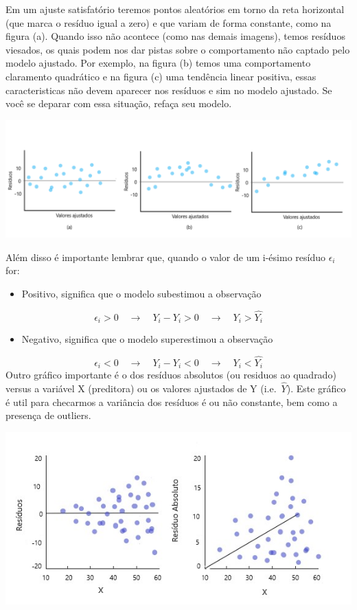 \documentclass[
]{article}
\providecommand{\tightlist}{%
  \setlength{\itemsep}{0pt}\setlength{\parskip}{0pt}}
\begin{document}
Em um ajuste satisfatório teremos pontos aleatórios em torno da reta
horizontal (que marca o resíduo igual a zero) e que variam de forma
constante, como na figura (a). Quando isso não acontece (como nas demais
imagens), temos resíduos viesados, os quais podem nos dar pistas sobre o
comportamento não captado pelo modelo ajustado. Por exemplo, na figura
(b) temos uma comportamento claramento quadrático e na figura (c) uma
tendência linear positiva, essas caracteristicas não devem aparecer nos
resíduos e sim no modelo ajustado. Se você se deparar com essa situação,
refaça seu modelo.

\includegraphics{images/residuos2.png}

Além disso é importante lembrar que, quando o valor de um i-ésimo
resíduo \(\epsilon_i\) for:

\begin{itemize}
\tightlist
\item
  Positivo, significa que o modelo subestimou a observação
\end{itemize}

\[\epsilon_i>0 \quad \to \quad Y_i-\hat{Y_i}>0 \quad \to \quad Y_i>\hat{Y_i}\]

\begin{itemize}
\tightlist
\item
  Negativo, significa que o modelo superestimou a observação
\end{itemize}

\[\epsilon_i<0 \quad \to \quad Y_i-\hat{Y_i}<0 \quad \to \quad Y_i<\hat{Y_i}\]
Outro gráfico importante é o dos resíduos absolutos (ou residuos ao
quadrado) versus a variável X (preditora) ou os valores ajustados de Y
(i.e.~\(\hat Y\)). Este gráfico é util para checarmos a variância dos
resíduos é ou não constante, bem como a presença de outliers.

\includegraphics{images/residuos4.JPG}
\end{document}
